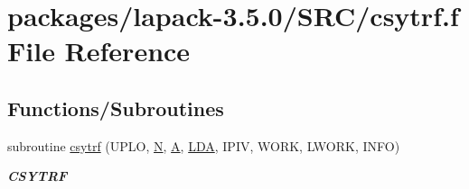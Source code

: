 \hypertarget{csytrf_8f}{}\section{packages/lapack-\/3.5.0/\+S\+R\+C/csytrf.f File Reference}
\label{csytrf_8f}
\subsection*{Functions/\+Subroutines}
\begin{DoxyCompactItemize}
\item 
subroutine \hyperlink{group__complexSYcomputational_gacd5839d735315079d2ecc8afc9402352}{csytrf} (U\+P\+L\+O, \hyperlink{polmisc_8c_a0240ac851181b84ac374872dc5434ee4}{N}, \hyperlink{classA}{A}, \hyperlink{example__user_8c_ae946da542ce0db94dced19b2ecefd1aa}{L\+D\+A}, I\+P\+I\+V, W\+O\+R\+K, L\+W\+O\+R\+K, I\+N\+F\+O)
\begin{DoxyCompactList}\small\item\em {\bfseries C\+S\+Y\+T\+R\+F} \end{DoxyCompactList}\end{DoxyCompactItemize}
